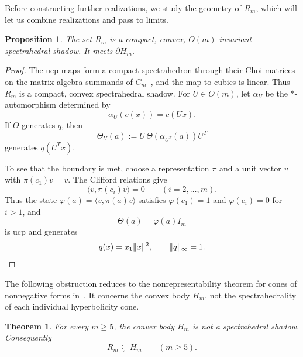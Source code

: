 \documentclass[11pt,onecolumn]{article}
\theoremstyle{blueplain}
\newtheorem{theorem}{Theorem}[section]
\newtheorem{proposition}[proposition]{Proposition}
\theoremstyle{bluedefinition}
\theoremstyle{bluedefinition}
\begin{document}
Before constructing further realizations, we study the geometry of $R_m$, which will let us combine realizations and pass to limits.

\begin{proposition}\label{p:clgeom}
The set $R_m$ is a compact, convex, $O(m)$-invariant spectrahedral shadow.
It meets $\partial H_m$.
\end{proposition}

\begin{proof}
The ucp maps form a compact spectrahedron through their Choi matrices
on the matrix-algebra summands of $C_m$~\cite{Choi}, and the map to cubics is linear.
Thus $R_m$ is a compact, convex spectrahedral shadow. For $U\in O(m)$, let
$\alpha_U$ be the $*$-automorphism determined by
\[
\alpha_U(c(x))=c(Ux).
\]
If $\Theta$ generates $q$, then
\[
\Theta_U(a):=U\,\Theta(\alpha_{U^T}(a))U^T
\]
generates $q(U^Tx)$.

To see that the boundary is met, choose a representation $\pi$ and a unit vector
$v$ with $\pi(c_1)v=v$. The Clifford relations give
\[
\langle v,\pi(c_i)v\rangle=0\qquad(i=2,\ldots,m).
\]
Thus the state $\varphi(a)=\langle v,\pi(a)v\rangle$ satisfies
$\varphi(c_1)=1$ and $\varphi(c_i)=0$ for $i>1$, and
\[
\Theta(a)=\varphi(a)I_m
\]
is ucp and generates
\[
q(x)=x_1\|x\|^2,\qquad \|q\|_\infty=1.\qedhere
\]
\end{proof}

The following obstruction reduces to the nonrepresentability theorem
for cones of nonnegative forms in~\cite{Scheiderer}.  It concerns the convex
body $H_m$, not the spectrahedrality of each individual
hyperbolicity cone.

\begin{theorem}\label{t:strict}
For every $m\geqslant5$, the convex body $H_m$ is not a spectrahedral shadow.
Consequently
\[
R_m\subsetneq H_m\qquad(m\geqslant5).
\]
\end{theorem}
\end{document}
